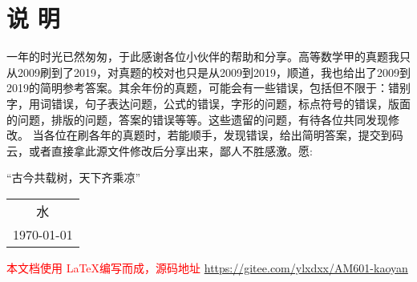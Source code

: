 




\chapter*{说 \quad 明}
\thispagestyle{empty}




一年的时光已然匆匆，于此感谢各位小伙伴的帮助和分享。高等数学甲的真题我只从2009刷到了2019，对真题的校对也只是从2009到2019，顺道，我也给出了2009到2019的简明参考答案。其余年份的真题，可能会有一些错误，包括但不限于：错别字，用词错误，句子表达问题，公式的错误，字形的问题，标点符号的错误，版面的问题，排版的问题，答案的错误等等。这些遗留的问题，有待各位共同发现修改。
当各位在刷各年的真题时，若能顺手，发现错误，给出简明答案，提交到码云，或者直接拿此源文件修改后分享出来，鄙人不胜感激。愿:
\begin{center}
	\kaishu 
	“古今共载树，天下齐乘凉”
\end{center}
\begin{center}
	\flushright
	\begin{tabular}{c}
		水   \\
		\today
	\end{tabular}	
\end{center}

\vfil
\noindent
\textcolor{red}{本文档使用 \LaTeX 编写而成，源码地址 \url{https://gitee.com/ylxdxx/AM601-kaoyan}  }
\vfil

\pagestyle{mypagestyle}

